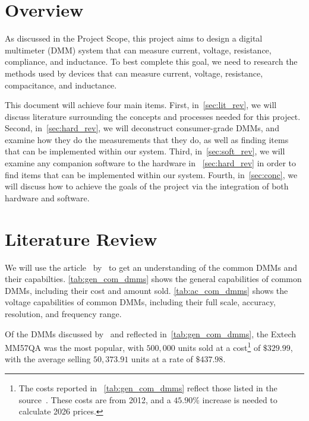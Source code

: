 \documentclass{article}
\begin{document}
    \maketitle
    \section{Overview}
    As discussed in the Project Scope, this project aims to design a digital multimeter (DMM)
    system that can measure current, voltage, resistance, compliance, and inductance.
    To best complete this goal, we need to research the methods used by devices that can measure current, voltage,
    resistance, compacitance, and inductance.

    This document will achieve four main items.
    First, in~\autoref{sec:lit_rev}, we will discuss literature surrounding the concepts and processes needed for
    this project.
    Second, in~\autoref{sec:hard_rev}, we will deconstruct consumer-grade DMMs, and examine how they do the
    measurements that they do, as well as finding items that can be implemented within our system.
    Third, in~\autoref{sec:soft_rev}, we will examine any companion software to the hardware in~
    \autoref{sec:hard_rev} in order to find items that can be implemented within our system.
    Fourth, in~\autoref{sec:conc}, we will discuss how to achieve the goals of the project via the integration of
    both hardware and software.

    \section{Literature Review}\label{sec:lit_rev}
    We will use the article~ by~\citeauthor{lecklider2012handheld} to get an
    understanding of the common DMMs and their capabilties.
    \autoref{tab:gen_com_dmms} shows the general capabilities of common DMMs, including their cost and amount sold.
    \autoref{tab:ac_com_dmms} shows the voltage capabilities of common DMMs, including their full scale, accuracy,
    resolution, and frequency range.~\parencite[24]{lecklider2012handheld}
    
    

    Of the DMMs discussed by~\citeauthor{lecklider2012handheld} and reflected in~\autoref{tab:gen_com_dmms}, the
    Extech MM57QA was the most popular, with $500,000$ units sold at a cost\footnote{The costs reported in~
    \autoref{tab:gen_com_dmms} reflect those listed in the source~\parencite[25]{lecklider2012handheld}.
    These costs are from 2012, and a $45.90\%$ increase is needed to calculate 2026 prices.}
    of $\$329.99$, with the average selling $50,373.91$ units at a rate of $\$437.98$.
\end{document}
